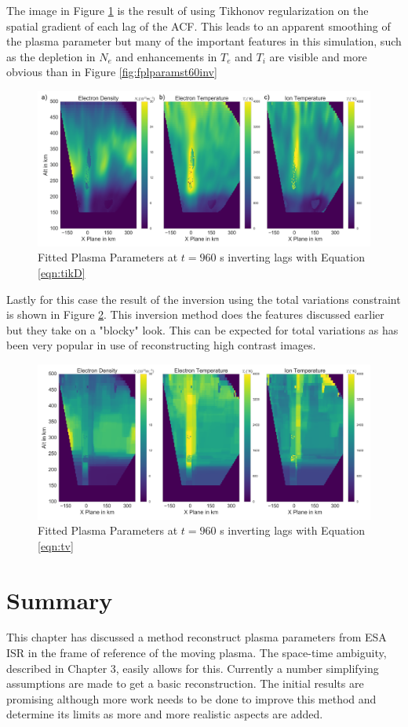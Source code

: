 The image in Figure \ref{fig:tikD} is the result of using Tikhonov regularization on the spatial gradient of each lag of the ACF. This leads to an apparent smoothing of the plasma parameter but many of the important features in this simulation, such as the depletion in $N_e$ and enhancements in $T_e$ and $T_i$ are visible and more obvious than in Figure \ref{fig:fplparamst60inv}
\begin{figure}[!ht]
\centering
\includegraphics[width=6in]{tikdfitted}
\caption{Fitted Plasma Parameters at $t=960$ s inverting lags with Equation \ref{eqn:tikD}}
\label{fig:tikD}
\end{figure}

Lastly for this case the result of the inversion using the total variations constraint is shown in Figure \ref{fig:tv}. This inversion method does the features discussed earlier but they take on a "blocky" look. This can be expected for total variations as has been very popular in use of reconstructing high contrast images\citep{Karl:2005jy}.
\begin{figure}[!ht]
\centering
\includegraphics[width=6in]{tvfitted}
\caption{Fitted Plasma Parameters at $t=960$ s inverting lags with Equation \ref{eqn:tv}}
\label{fig:tv}
\end{figure}

\section{Summary}

This chapter has discussed a method reconstruct plasma parameters from ESA ISR in the frame of reference of the moving plasma. The space-time ambiguity, described in Chapter 3, easily allows for this. Currently a number simplifying assumptions are made to get a basic reconstruction. The initial results are promising although more work needs to be done to improve this method and determine its limits as more and more realistic aspects are added.